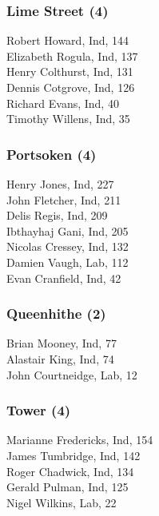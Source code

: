 \documentclass[a4paper,openany,10pt]{book}
\begin{document}
\subsubsection*{Lime Street (4)}



Robert Howard, Ind, 144\\
Elizabeth Rogula, Ind, 137\\
Henry Colthurst, Ind, 131\\
Dennis Cotgrove, Ind, 126\\
Richard Evans, Ind, 40\\
Timothy Willens, Ind, 35\\


\subsubsection*{Portsoken (4)}



Henry Jones, Ind, 227\\
John Fletcher, Ind, 211\\
Delis Regis, Ind, 209\\
Ibthayhaj Gani, Ind, 205\\
Nicolas Cressey, Ind, 132\\
Damien Vaugh, Lab, 112\\
Evan Cranfield, Ind, 42\\


\subsubsection*{Queenhithe (2)}



Brian Mooney, Ind, 77\\
Alastair King, Ind, 74\\
John Courtneidge, Lab, 12\\


\subsubsection*{Tower (4)}



Marianne Fredericks, Ind, 154\\
James Tumbridge, Ind, 142\\
Roger Chadwick, Ind, 134\\
Gerald Pulman, Ind, 125\\
Nigel Wilkins, Lab, 22\\
\end{document}
